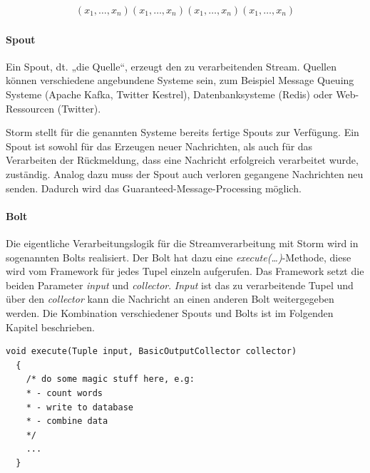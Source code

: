 \documentclass[a4paper,11pt]{scrartcl}
\begin{document}
  \begin{align*}
    (x_1, \ldots , x_n)
    (x_1, \ldots , x_n)
    (x_1, \ldots , x_n)
    (x_1, \ldots , x_n)
  \end{align*}
  \begin{figure}[!h]
    \centering
    \vspace*{-1cm}
  \end{figure}

  \paragraph{Spout}
  Ein Spout, dt. „die Quelle“, erzeugt den zu verarbeitenden Stream.
  Quellen können verschiedene angebundene Systeme sein, zum
  Beispiel Message Queuing Systeme (Apache Kafka, Twitter Kestrel),
  Datenbanksysteme (Redis) oder Web-Ressourcen (Twitter).

  Storm stellt für die genannten Systeme bereits fertige Spouts zur
  Verfügung. Ein Spout ist sowohl für das Erzeugen neuer Nachrichten,
  als auch für das Verarbeiten der Rückmeldung, dass eine Nachricht
  erfolgreich verarbeitet wurde, zuständig. Analog dazu muss der Spout
  auch verloren gegangene Nachrichten neu senden. Dadurch wird das
  Guaranteed-Message-Processing möglich.


  \paragraph{Bolt}
  Die eigentliche Verarbeitungslogik für die Streamverarbeitung mit
  Storm wird in sogenannten Bolts realisiert. Der Bolt hat dazu eine
  \textit{execute(\ldots)}-Methode, diese wird vom Framework für jedes
  Tupel einzeln aufgerufen. Das Framework setzt die beiden Parameter
  \textit{input} und \textit{collector}. \textit{Input} ist das zu
  verarbeitende Tupel und über den \textit{collector} kann die
  Nachricht an einen anderen Bolt weitergegeben werden. Die
  Kombination verschiedener Spouts und Bolts ist im Folgenden Kapitel
  beschrieben.

  \begin{lstlisting}[caption={Methodensignatur einer Bolt-Implementierung}]
  void execute(Tuple input, BasicOutputCollector collector)
  {
    /* do some magic stuff here, e.g:
    * - count words
    * - write to database
    * - combine data
    */
    ...
  }
  \end{lstlisting}
\end{document}
